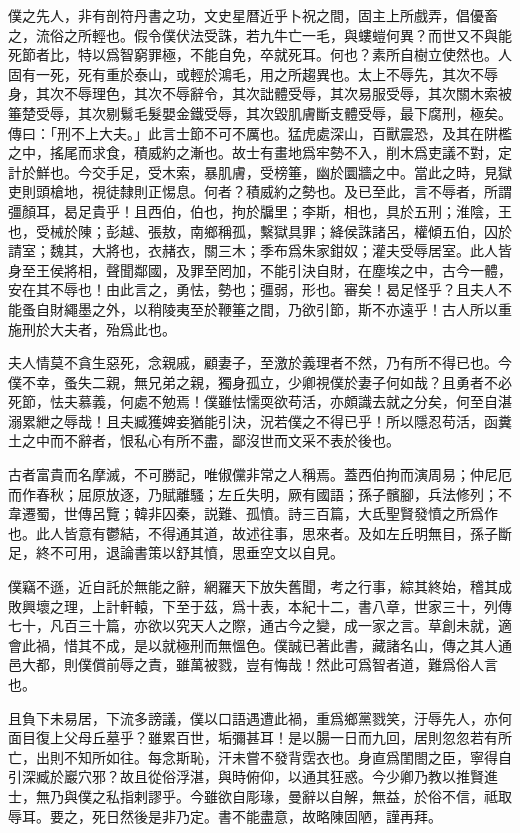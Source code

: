 僕之先人，非有剖符丹書之功，文史星暦近乎卜祝之間，固主上所戲弄，倡優畜之，流俗之所輕也。假令僕伏法受誅，若九牛亡一毛，與螻螘何異？而世又不與能死節者比，特以爲智窮罪極，不能自免，卒就死耳。何也？素所自樹立使然也。人固有一死，死有重於泰山，或輕於鴻毛，用之所趨異也。太上不辱先，其次不辱身，其次不辱理色，其次不辱辭令，其次詘體受辱，其次易服受辱，其次關木索被箠楚受辱，其次剔鬄毛髮嬰金鐵受辱，其次毀肌膚斷支體受辱，最下腐刑，極矣。傳曰：「刑不上大夫。」此言士節不可不厲也。猛虎處深山，百獸震恐，及其在阱檻之中，搖尾而求食，積威約之漸也。故士有畫地爲牢勢不入，削木爲吏議不對，定計於鮮也。今交手足，受木索，暴肌膚，受榜箠，幽於圜牆之中。當此之時，見獄吏則頭槍地，視徒隸則正惕息。何者？積威約之勢也。及已至此，言不辱者，所謂彊顏耳，曷足貴乎！且西伯，伯也，拘於牖里；李斯，相也，具於五刑；淮陰，王也，受械於陳；彭越、張敖，南鄉稱孤，繫獄具罪；絳侯誅諸呂，權傾五伯，囚於請室；魏其，大將也，衣赭衣，關三木；季布爲朱家鉗奴；灌夫受辱居室。此人皆身至王侯將相，聲聞鄰國，及罪至罔加，不能引決自財，在塵埃之中，古今一體，安在其不辱也！由此言之，勇怯，勢也；彊弱，形也。審矣！曷足怪乎？且夫人不能蚤自財繩墨之外，以稍陵夷至於鞭箠之間，乃欲引節，斯不亦遠乎！古人所以重施刑於大夫者，殆爲此也。

夫人情莫不貪生惡死，念親戚，顧妻子，至激於義理者不然，乃有所不得已也。今僕不幸，蚤失二親，無兄弟之親，獨身孤立，少卿視僕於妻子何如哉？且勇者不必死節，怯夫慕義，何處不勉焉！僕雖怯懦耎欲苟活，亦頗識去就之分矣，何至自湛溺累紲之辱哉！且夫臧獲婢妾猶能引決，況若僕之不得已乎！所以隱忍苟活，函糞土之中而不辭者，恨私心有所不盡，鄙沒世而文采不表於後也。

古者富貴而名摩滅，不可勝記，唯俶儻非常之人稱焉。蓋西伯拘而演周易；仲尼厄而作春秋；屈原放逐，乃賦離騷；左丘失明，厥有國語；孫子髕腳，兵法修列；不韋遷蜀，世傳呂覽；韓非囚秦，説難、孤憤。詩三百篇，大氐聖賢發憤之所爲作也。此人皆意有鬱結，不得通其道，故述往事，思來者。及如左丘明無目，孫子斷足，終不可用，退論書策以舒其憤，思垂空文以自見。

僕竊不遜，近自託於無能之辭，網羅天下放失舊聞，考之行事，綜其終始，稽其成敗興壞之理，上計軒轅，下至于茲，爲十表，本紀十二，書八章，世家三十，列傳七十，凡百三十篇，亦欲以究天人之際，通古今之變，成一家之言。草創未就，適會此禍，惜其不成，是以就極刑而無慍色。僕誠已著此書，藏諸名山，傳之其人通邑大都，則僕償前辱之責，雖萬被戮，豈有悔哉！然此可爲智者道，難爲俗人言也。

且負下未易居，下流多謗議，僕以口語遇遭此禍，重爲鄉黨戮笑，汙辱先人，亦何面目復上父母丘墓乎？雖累百世，垢彌甚耳！是以腸一日而九回，居則忽忽若有所亡，出則不知所如往。每念斯恥，汗未嘗不發背霑衣也。身直爲閨閤之臣，寧得自引深臧於巖穴邪？故且從俗浮湛，與時俯仰，以通其狂惑。今少卿乃教以推賢進士，無乃與僕之私指剌謬乎。今雖欲自彫瑑，曼辭以自解，無益，於俗不信，祗取辱耳。要之，死日然後是非乃定。書不能盡意，故略陳固陋，謹再拜。

